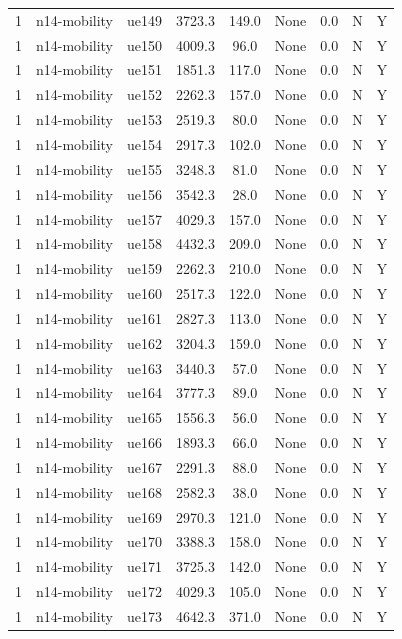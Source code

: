\begin{table}[ht]
\begin{tabular}{|c|c|c|c|c|c|c|c|c|}
1 & n14-mobility & ue149 & 3723.3 & 149.0 & None & 0.0 & N & Y \\
1 & n14-mobility & ue150 & 4009.3 & 96.0 & None & 0.0 & N & Y \\
1 & n14-mobility & ue151 & 1851.3 & 117.0 & None & 0.0 & N & Y \\
1 & n14-mobility & ue152 & 2262.3 & 157.0 & None & 0.0 & N & Y \\
1 & n14-mobility & ue153 & 2519.3 & 80.0 & None & 0.0 & N & Y \\
1 & n14-mobility & ue154 & 2917.3 & 102.0 & None & 0.0 & N & Y \\
1 & n14-mobility & ue155 & 3248.3 & 81.0 & None & 0.0 & N & Y \\
1 & n14-mobility & ue156 & 3542.3 & 28.0 & None & 0.0 & N & Y \\
1 & n14-mobility & ue157 & 4029.3 & 157.0 & None & 0.0 & N & Y \\
1 & n14-mobility & ue158 & 4432.3 & 209.0 & None & 0.0 & N & Y \\
1 & n14-mobility & ue159 & 2262.3 & 210.0 & None & 0.0 & N & Y \\
1 & n14-mobility & ue160 & 2517.3 & 122.0 & None & 0.0 & N & Y \\
1 & n14-mobility & ue161 & 2827.3 & 113.0 & None & 0.0 & N & Y \\
1 & n14-mobility & ue162 & 3204.3 & 159.0 & None & 0.0 & N & Y \\
1 & n14-mobility & ue163 & 3440.3 & 57.0 & None & 0.0 & N & Y \\
1 & n14-mobility & ue164 & 3777.3 & 89.0 & None & 0.0 & N & Y \\
1 & n14-mobility & ue165 & 1556.3 & 56.0 & None & 0.0 & N & Y \\
1 & n14-mobility & ue166 & 1893.3 & 66.0 & None & 0.0 & N & Y \\
1 & n14-mobility & ue167 & 2291.3 & 88.0 & None & 0.0 & N & Y \\
1 & n14-mobility & ue168 & 2582.3 & 38.0 & None & 0.0 & N & Y \\
1 & n14-mobility & ue169 & 2970.3 & 121.0 & None & 0.0 & N & Y \\
1 & n14-mobility & ue170 & 3388.3 & 158.0 & None & 0.0 & N & Y \\
1 & n14-mobility & ue171 & 3725.3 & 142.0 & None & 0.0 & N & Y \\
1 & n14-mobility & ue172 & 4029.3 & 105.0 & None & 0.0 & N & Y \\
1 & n14-mobility & ue173 & 4642.3 & 371.0 & None & 0.0 & N & Y \\

\end{tabular}
\end{table}
